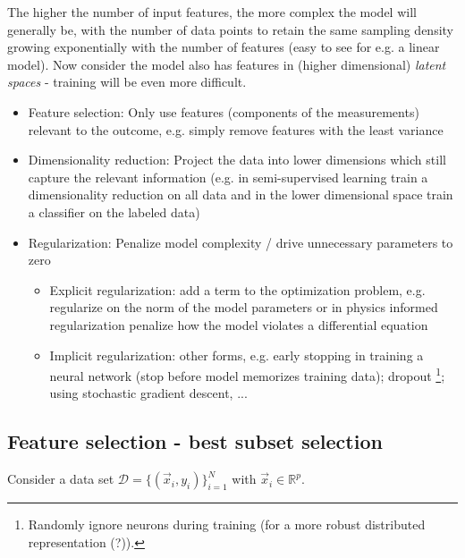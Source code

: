 The higher the number of input features, the more complex the model will generally be, with 
the number of data points to retain the same sampling density growing exponentially with the number of features
(easy to see for e.g. a linear model). Now consider the model also has features in (higher dimensional)
\textit{latent spaces} - training will be even more difficult.


\begin{itemize}
    \item \textcolor{blue1}{Feature selection}: Only use features (components of the measurements) relevant to the outcome, e.g. simply remove features with the least variance
    \item \textcolor{blue1}{Dimensionality reduction}: Project the data into lower dimensions which still capture 
    the relevant information (e.g. in semi-supervised learning train a dimensionality reduction on all data
    and in the lower dimensional space train a classifier on the labeled data)
    \item \textcolor{blue1}{Regularization}: Penalize model complexity / drive unnecessary parameters to zero
    \begin{itemize}
        \item Explicit regularization: add a term to the optimization problem, e.g. regularize on the norm of the model parameters or in physics informed regularization penalize how the model violates a differential equation
        \item Implicit regularization: other forms, e.g. early stopping in training a neural network (stop before model memorizes training data); dropout \footnote{Randomly ignore neurons during training (for a more robust distributed representation (?)).}; using stochastic gradient descent, ...
    \end{itemize}
\end{itemize}

\subsection{Feature selection - best subset selection}
Consider a data set $\mathcal{D} = \{(\vec{x}_i, y_i)\}_{i=1}^N$ with $\vec{x}_i \in \mathbb{R}^p$.


